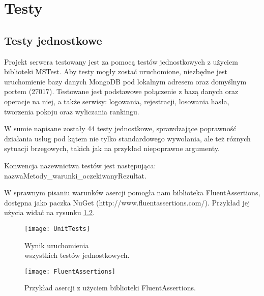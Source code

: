 \chapter{Testy}
\section{Testy jednostkowe}
Projekt serwera testowany jest za pomocą testów jednostkowych z użyciem biblioteki MSTest. Aby testy mogły zostać uruchomione, niezbędne jest uruchomienie bazy danych MongoDB pod lokalnym adresem oraz domyślnym portem (27017). Testowane jest podstawowe połączenie z bazą danych oraz operacje na niej, a także serwisy: logowania, rejestracji, losowania hasła, tworzenia pokoju oraz wyliczania rankingu.

W sumie napisane zostały 44 testy jednostkowe, sprawdzające poprawność działania usług pod kątem nie tylko standardowego wywołania, ale też róznych sytuacji brzegowych, takich jak na przykład niepoprawne argumenty.

Konwencja nazewnictwa testów jest następująca: nazwaMetody{\_}warunki{\_}oczekiwanyRezultat.

W sprawnym pisaniu warunków asercji pomogła nam biblioteka FluentAssertions, dostępna jako paczka NuGet (http://www.fluentassertions.com/). Przykład jej użycia widać na rysunku \ref{fig:fluentassertions}.

\begin{figure}[htbp]
\centering
\texttt{[image: UnitTests]}
\caption{Wynik uruchomienia\\wszystkich testów jednostkowych.}
\label{fig:unittests}
\end{figure}

\begin{figure}[htbp]
\centering
\texttt{[image: FluentAssertions]}
\caption{Przykład asercji z użyciem biblioteki FluentAssertions.}
\label{fig:fluentassertions}
\end{figure}

